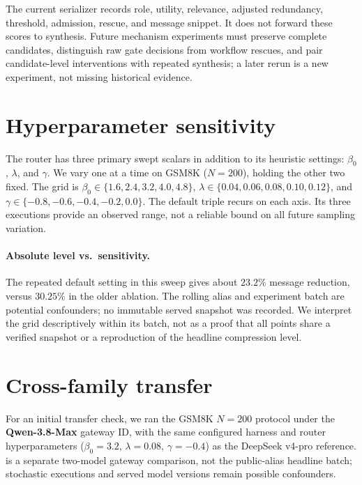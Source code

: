 \documentclass[11pt,twoside,twocolumn,letterpaper]{article}
\begin{document}
The current serializer records role, utility, relevance, adjusted redundancy, threshold, admission, rescue, and message snippet. It does not forward these scores to synthesis. Future mechanism experiments must preserve complete candidates, distinguish raw gate decisions from workflow rescues, and pair candidate-level interventions with repeated synthesis; a later rerun is a new experiment, not missing historical evidence.

\section{Hyperparameter sensitivity}\label{app:sensitivity}

The router has three primary swept scalars in addition to its heuristic settings: $\beta_0$, $\lambda$, and $\gamma$. We vary one at a time on GSM8K ($N=200$), holding the other two fixed. The grid is $\beta_0\in\{1.6,2.4,3.2,4.0,4.8\}$, $\lambda\in\{0.04,0.06,0.08,0.10,0.12\}$, and $\gamma\in\{-0.8,-0.6,-0.4,-0.2,0.0\}$. The default triple recurs on each axis. Its three executions provide an observed range, not a reliable bound on all future sampling variation.



\paragraph{Absolute level vs.\ sensitivity.} The repeated default setting in this sweep gives about $23.2\%$ message reduction, versus $30.25\%$ in the older ablation. The rolling alias and experiment batch are potential confounders; no immutable served snapshot was recorded. We interpret the grid descriptively within its batch, not as a proof that all points share a verified snapshot or a reproduction of the headline compression level.

\section{Cross-family transfer}\label{app:crossmodel}

For an initial transfer check, we ran the GSM8K $N=200$ protocol under the \textbf{Qwen-3.8-Max} gateway ID, with the same configured harness and router hyperparameters ($\beta_0=3.2$, $\lambda=0.08$, $\gamma=-0.4$) as the DeepSeek v4-pro reference.  is a separate two-model gateway comparison, not the public-alias headline batch; stochastic executions and served model versions remain possible confounders.
\end{document}
